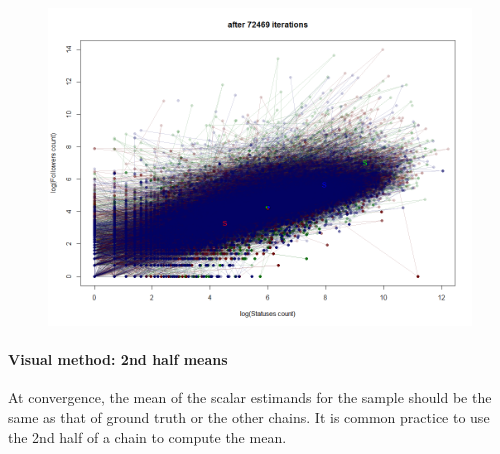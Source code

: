 \begin{figure}[htb]
\caption{}\label{fig:con3}
    \endminipage\hfill
    \includegraphics[width=\linewidth]{figs/2dconv_72469iters.png}
\caption{}\label{fig:con4}
    \endminipage
\end{figure}

\paragraph{Visual method: 2nd half means}

At convergence, the mean of the scalar estimands for the sample should
be the same as that of ground truth or the other chains. It is common
practice to use the 2nd half of a chain to compute the mean.

